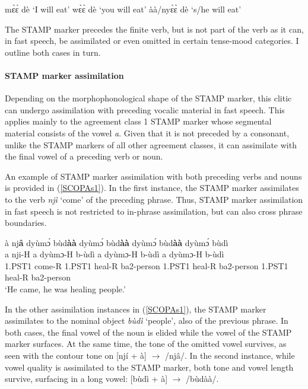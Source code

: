 \begin{exe} 
\ex\label{FUTexept} 
\begin{xlist}
\ex mɛ̀ɛ̀ dè `I will eat'
\ex wɛ̀ɛ̀ dè `you will eat'
\ex àà/nyɛ̀ɛ̀ dè `s/he will eat'
\end{xlist}
\end{exe}




The STAMP marker precedes the finite verb, but is not part of the verb as it can, in fast speech, be assimilated or even omitted in certain tense-mood categories. I outline both cases in turn.

\paragraph{STAMP marker assimilation}
Depending on the morphophonological shape of the STAMP marker, this clitic can undergo assimilation with preceding vocalic material in fast speech. This applies mainly to the agreement class 1 STAMP marker whose segmental material consists of the vowel {\itshape a}. Given that it is not preceded by a consonant, unlike the STAMP markers of all other agreement classes, it can assimilate with the final vowel of a preceding verb or noun.

An example of STAMP marker assimilation with both preceding verbs and nouns is provided in (\ref{SCOPAs1}). In the first instance, the STAMP marker assimilates to the verb {\itshape njì} `come' of the preceding phrase. Thus, STAMP marker assimilation in fast speech is not restricted to in-phrase assimilation, but can also cross phrase boundaries. 

\begin{exe} 
\ex\label{SCOPAs1}
  \glll  à nj{\bfseries â} dyùmɔ́ bùd{\bfseries àà} dyùmɔ́ bùd{\bfseries àà} dyùmɔ́ bùd{\bfseries àà} dyùmɔ́ bùdì  \\
           a nji-H a dyùmɔ-H b-ùdì a dyùmɔ-H  b-ùdì a dyùmɔ-H b-ùdì   \\
          1.PST1 come-R 1.PST1 heal-R ba2-person 1.PST1 heal-R ba2-person 1.PST1 heal-R ba2-person  \\
    \trans `He came, he was healing people.'
\end{exe}

\noindent In the other assimilation instances in (\ref{SCOPAs1}), the STAMP marker assimilates to the nominal object {\itshape bùdì} `people', also of the previous phrase. In both cases, the final vowel of the noun is elided while the vowel of the STAMP marker surfaces. At the same time, the tone of the omitted vowel survives, as seen with the contour tone on [njí + à]  $\rightarrow$ /njâ/. In the second instance, while vowel quality is assimilated to the STAMP marker, both tone and vowel length survive, surfacing in a long vowel: [bùdì + à] $\rightarrow$ /bùdàà/.


